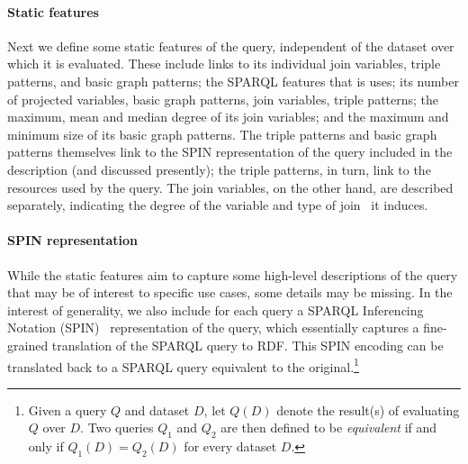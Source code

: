 \paragraph{Static features} Next we define some static features of the query, independent of the dataset over which it is evaluated. These include links to its individual join variables, triple patterns, and basic graph patterns; the SPARQL features that is uses; its number of projected variables, basic graph patterns, join variables, triple patterns; the maximum, mean and median degree of its join variables; and the maximum and minimum size of its basic graph patterns. The triple patterns and basic graph patterns themselves link to the SPIN representation of the query included in the description (and discussed presently); the triple patterns, in turn, link to the resources used by the query. The join variables, on the other hand, are described separately, indicating the degree of the variable and type of join~\cite{SaleemN14} it induces.

\paragraph{SPIN representation} While the static features aim to capture some high-level descriptions of the query that may be of interest to specific use cases, some details may be missing. In the interest of generality, we also include for each query a SPARQL Inferencing Notation (SPIN)~\cite{spin} representation of the query, which essentially captures a fine-grained translation of the SPARQL query to RDF. This SPIN encoding can be translated back to a SPARQL query equivalent to the original.\footnote{Given a query $Q$ and dataset $D$, let $Q(D)$ denote the result(s) of evaluating $Q$ over $D$. Two queries $Q_1$ and $Q_2$ are then defined to be \textit{equivalent} if and only if $Q_1(D) = Q_2(D)$ for every dataset $D$.} 


